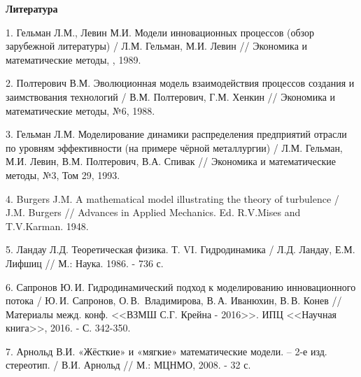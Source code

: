 \begin{center}

{\bf Литература}

\end{center}

1. Гельман Л.М., Левин М.И. Модели инновационных процессов (обзор
зарубежной литературы) / Л.М. Гельман,  М.И. Левин // Экономика и
математические методы, , 1989.

2. Полтерович В.М. Эволюционная модель взаимодействия процессов
создания и заимствования технологий /
\linebreak
В.М. Полтерович, Г.М. Хенкин
// Экономика и математические методы, №6, 1988.

3. Гельман Л.М. Моделирование динамики распределения предприятий
отрасли по уровням эффективности (на примере чёрной металлургии) /
Л.М. Гельман, М.И. Левин, В.М. Полтерович, В.А. Спивак // Экономика
и математические методы, №3, Том 29, 1993.


4. Burgers J.M. A mathematical model illustrating the theory of
turbulence / J.M. Burgers // Advances in Applied Mechanics. Ed.
R.V.Mises and T.V.Karman. 1948.


5. Ландау Л.Д. Теоретическая физика. Т. VI. Гидродинамика / Л.Д.
Ландау, Е.М. Лифшиц //  М.: Наука. 1986. - 736 с.

6. Сапронов Ю.\,И. Гидродинамический подход к моделированию
инновационного потока / Ю.\,И. Сапронов,
\linebreak
О.\,В.~Владимирова, В.\,А.
Иванюхин, В.\,В. Конев // Материалы межд. конф. <<ВЗМШ С.Г. Крейна -
2016>>. ИПЦ <<Научная книга>>, 2016. - С. 342-350.

7. Арнольд В.И. «Жёсткие» и «мягкие» математические модели. – 2-е
изд. стереотип. / В.И. Арнольд // М.: МЦНМО, 2008. - 32 с.
